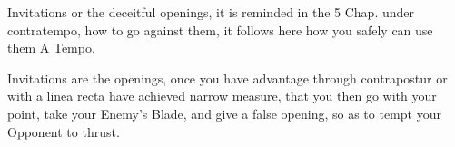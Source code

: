 

Invitations or the deceitful openings, it is reminded in the 5 Chap. under
contratempo, how to go against them, it follows here how you safely
can use them A Tempo.


Invitations are the openings, once you have advantage through contrapostur
or with a linea recta have achieved narrow measure, that you then go
with your point, take your Enemy's Blade, and give a false opening, so
as to tempt your Opponent to thrust.